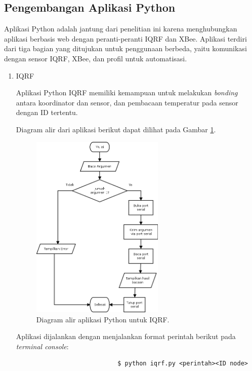 		\subsection{Pengembangan Aplikasi Python}
			Aplikasi Python adalah jantung dari penelitian ini karena menghubungkan aplikasi berbasis web dengan peranti-peranti IQRF dan XBee.	Aplikasi terdiri dari tiga bagian yang ditujukan untuk penggunaan berbeda, yaitu komunikasi dengan sensor IQRF, XBee, dan profil untuk automatisasi.

			\begin{enumerate}
				\item IQRF

					Aplikasi Python IQRF memiliki kemampuan untuk melakukan \emph{bonding} antara koordinator dan sensor, dan pembacaan temperatur pada sensor dengan ID tertentu.

					Diagram alir dari aplikasi berikut dapat dilihat pada Gambar \ref{python-iqrf}.

					\begin{figure}[H]
					  \centering
					    \includegraphics[width=0.6\textwidth]{gambar/python-iqrf}
					    \caption{Diagram alir aplikasi Python untuk IQRF.}
					    \label{python-iqrf}
					\end{figure}

					Aplikasi dijalankan dengan menjalankan format perintah berikut pada \emph{terminal console}:
					\begingroup
					    \fontsize{10pt}{12pt}\selectfont
					    \begin{verbatim}
							$ python iqrf.py <perintah><ID node>
					    \end{verbatim}  
					\endgroup


\end{enumerate}
